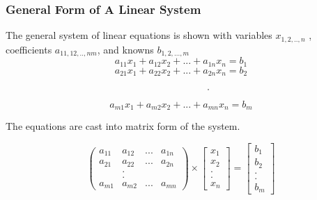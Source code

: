 \documentclass[fleqn]{beamer} %
\newcommand{\sectionIsubsectionIItitle}{General Form of  A Linear System}
\begin{document}
			\begin{frame}
				\frametitle{\sectionIsubsectionIItitle} \small
				\bigskip

				\begin{fleqn}
		
					The general system of linear equations  is shown with variables $x_{1,2,..,n}$ , coefficients $a_{11,12,..,nm}$, and knowns $b_{1,2,...,m}$ \vspace{1mm}\\		  
					
					\[a_{11} x_1 + a_{12} x_{2} + ... + a_{1n} x_n = b_1 \] 
					\[a_{21} x_1 + a_{22} x_{2} + ... + a_{2n} x_n = b_2 \] 
					\[\hspace{20mm}.\]		
					\[a_{m1} x_1 + a_{m2} x_{2} + ... + a_{mn} x_n = b_m \]			

				\end{fleqn}  

				The equations are cast into matrix form of the system. 	\\
				\begin{fleqn}

					\[ \left( \begin{array}{cccc}
					a_{11} & a_{12} & ...& a_{1n} \\
					a_{21} & a_{22} & ...& a_{2n} \\
					&.&&\\
					&.&&\\
					a_{m1} & a_{m2} & ...& a_{mn}\end{array} \right) \times \left[ \begin{array}{c}
					x_1 \\
					x_2 \\
					.\\
					.\\
					x_n \end{array} \right] = \left[ \begin{array}{c}
					b_1 \\
					b_2 \\
					.\\
					.\\
					b_m \end{array} \right]\] 

				\end{fleqn}

				\btVFill
			\end{frame}
\end{document}
